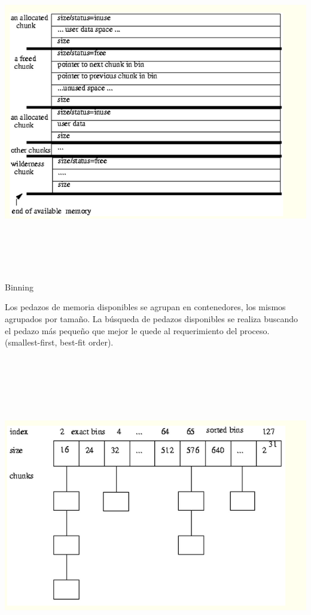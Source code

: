 \documentclass[11pt]{article} %
\begin{document}
\includegraphics[height=14cm]{imagenes/boundary.png}

Binning

Los pedazos de memoria disponibles se agrupan en contenedores, los mismos agrupados por tamaño.  La búsqueda de pedazos disponibles se realiza buscando el pedazo más pequeño que mejor le quede al requerimiento del proceso. (smallest-first, best-fit order).



\includegraphics[height=14cm]{imagenes/binning.png}
\end{document}
